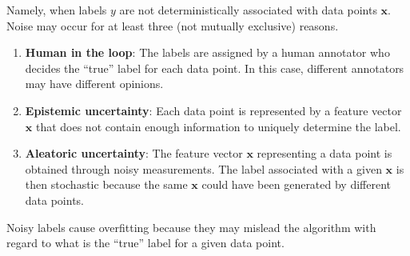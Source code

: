 \begin{itemize}
        Namely, when labels $y$ are not deterministically associated with data points $\boldsymbol{x}$. Noise may occur for at least three (not mutually exclusive) reasons. 
        \begin{enumerate}
            \item \textbf{Human in the loop}: The labels are assigned by a human annotator who decides the ``true'' label for each data point. In this case, different annotators may have different opinions.
            \item \textbf{Epistemic uncertainty}: Each data point is represented by a feature vector $\boldsymbol{x}$ that does not contain enough information to uniquely determine the label.             
            \item \textbf{Aleatoric uncertainty}: The feature vector $\boldsymbol{x}$ representing a data point is obtained through noisy measurements. The label associated with a given $\boldsymbol{x}$ is then stochastic because the same $\boldsymbol{x}$ could have been generated by different data points.
        \end{enumerate}   
        Noisy labels cause overfitting because they may mislead the algorithm with regard to what is the ``true'' label for a given data point.

\end{itemize}
